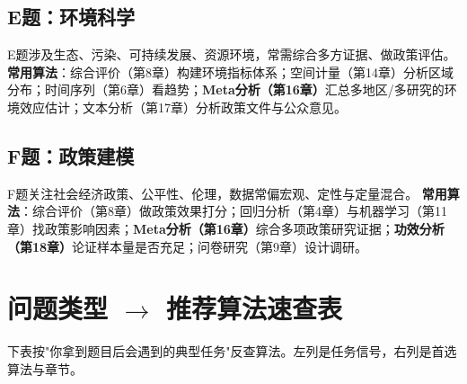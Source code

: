 \subsection{E题：环境科学}
E题涉及生态、污染、可持续发展、资源环境，常需综合多方证据、做政策评估。
\textbf{常用算法}：综合评价（第8章）构建环境指标体系；空间计量（第14章）分析区域分布；时间序列（第6章）看趋势；\textbf{Meta分析（第16章）}汇总多地区/多研究的环境效应估计；文本分析（第17章）分析政策文件与公众意见。

\subsection{F题：政策建模}
F题关注社会经济政策、公平性、伦理，数据常偏宏观、定性与定量混合。
\textbf{常用算法}：综合评价（第8章）做政策效果打分；回归分析（第4章）与机器学习（第11章）找政策影响因素；\textbf{Meta分析（第16章）}综合多项政策研究证据；\textbf{功效分析（第18章）}论证样本量是否充足；问卷研究（第9章）设计调研。

\section{问题类型 $\rightarrow$ 推荐算法速查表}

下表按"你拿到题目后会遇到的典型任务"反查算法。左列是任务信号，右列是首选算法与章节。

